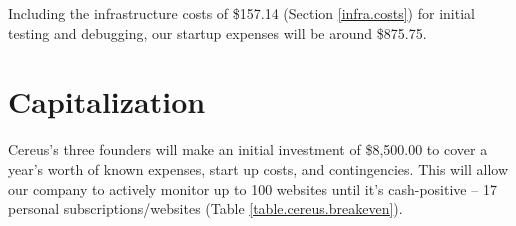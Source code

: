 \noindent
Including the infrastructure costs of \$157.14 (Section \ref{infra.costs}) for initial testing and debugging, our startup expenses will be around \$875.75.

\section{Capitalization}

Cereus's three founders will make an initial investment of \$8,500.00 to cover a year's worth of known expenses, start up costs, and contingencies. This will allow our company to actively monitor up to 100 websites until it's cash-positive -- 17 personal subscriptions/websites (Table \ref{table.cereus.breakeven}).

